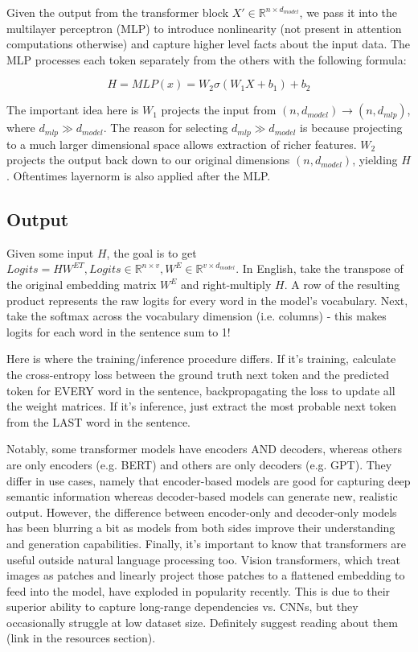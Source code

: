 \documentclass[12pt]{article}
\begin{document}
Given the output from the transformer block $X' \in \mathbb{R}^{n \times d_{model}}$, we pass it into the multilayer perceptron (MLP) to introduce nonlinearity (not present in attention computations otherwise) and capture higher level facts about the input data. The MLP processes each token separately from the others with the following formula: 

$$H = MLP(x) = W_2\sigma(W_1X + b_1) + b_2$$

The important idea here is \(W_1\) projects the input from \((n, d_{model}) \rightarrow (n, d_{mlp})\),
where \(d_{mlp} \gg d_{model}\). The reason for selecting \(d_{mlp} \gg d_{model}\) is because projecting to a much larger dimensional space allows extraction of richer features. \(W_2\) projects the output back down to our original dimensions \((n, d_{model})\), yielding $H$. Oftentimes layernorm is also applied after the MLP. 

\subsection{Output}

Given some input $H$, the goal is to get 
\(Logits = HW^{ET}, Logits \in \mathbb{R}^{n \times v}, W^E \in \mathbb{R}^{v \times d_{model}}\). In English, take the transpose of the original embedding matrix $W^E$ and right-multiply $H$. A row of the resulting product represents the raw logits for every word in the model's vocabulary. Next, take the softmax across the vocabulary dimension (i.e. columns) - this makes logits for each word in the sentence sum to 1! 

Here is where the training/inference procedure differs. If it's training, calculate the cross-entropy loss between the ground truth next token and the predicted token for EVERY word in the sentence, backpropagating the loss to update all the weight matrices. If it's inference, just extract the most probable next token from the LAST word in the sentence. 

Notably, some transformer models have encoders AND decoders, whereas others are only encoders (e.g. BERT) and others are only decoders (e.g. GPT). They differ in use cases, namely that encoder-based models are good for capturing deep semantic information whereas decoder-based models can generate new, realistic output. However, the difference between encoder-only and decoder-only models has been blurring a bit as models from both sides improve their understanding and generation capabilities. Finally, it's important to know that transformers are useful outside natural language processing too. Vision transformers, which treat images as patches and linearly project those patches to a flattened embedding to feed into the model, have exploded in popularity recently. This is due to their superior ability to capture long-range dependencies vs. CNNs, but they occasionally struggle at low dataset size. Definitely suggest reading about them (link in the resources section). 
\end{document}
